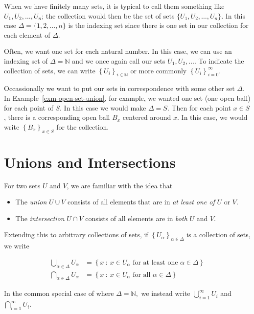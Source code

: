 \documentclass[
  letterpaper,
  DIV=11,
  numbers=noendperiod]{scrreprt}
\providecommand{\tightlist}{%
  \setlength{\itemsep}{0pt}\setlength{\parskip}{0pt}}
\def\N{\mathbb N}
\newcommand{\st}{~:~}
\theoremstyle{plain}
\theoremstyle{definition}
\theoremstyle{plain}
\theoremstyle{plain}
\theoremstyle{definition}
\theoremstyle{definition}
\theoremstyle{remark}
\begin{document}
When we have finitely many sets, it is typical to call them something
like \(U_1,U_2,\ldots,U_n\); the collection would then be the set of
sets \(\{U_1,U_2,\ldots,U_n\}\). In this case
\(\Delta=\{1,2,\ldots,n\}\) is the indexing set since there is one set
in our collection for each element of \(\Delta\).

Often, we want one set for each natural number. In this case, we can use
an indexing set of \(\Delta=\N\) and we once again call our sets
\(U_1,U_2,\ldots\). To indicate the collection of sets, we can write
\(\left\{U_i\right\}_{i\in\N}\) or more commonly
\(\left\{U_i\right\}_{i=0}^\infty\).

Occassionally we want to put our sets in correspondence with some other
set \(\Delta\). In Example~\ref{exm-open-set-union}, for example, we
wanted one set (one open ball) for each point of \(S\). In this case we
would make \(\Delta=S\). Then for each point \(x\in S\), there is a
corresponding open ball \(B_x\) centered around \(x\). In this case, we
would write \(\left\{B_x\right\}_{x\in S}\) for the collection.

\section{Unions and Intersections}\label{sec-union-intersection}

For two sets \(U\) and \(V\), we are familiar with the idea that

\begin{itemize}
\tightlist
\item
  The \emph{union} \(U\cup V\) consists of all elements that are in
  \emph{at least one of} \(U\) or \(V\).
\item
  The \emph{intersection} \(U\cap V\) consists of all elements are in
  \emph{both} \(U\) and \(V\).
\end{itemize}

Extending this to arbitrary collections of sets, if
\(\left\{U_\alpha\right\}_{\alpha\in\Delta}\) is a collection of sets,
we write

\[\begin{aligned}
  \bigcup_{\alpha\in\Delta} U_\alpha &= \left\{x\st \text{$x\in U_\alpha$ for at least one $\alpha\in\Delta$}\right\}\\
  \bigcap_{\alpha\in\Delta} U_\alpha &= \left\{x\st \text{$x\in U_\alpha$ for all $\alpha\in\Delta$}\right\}
\end{aligned}\]

In the common special case of where \(\Delta=\N,\) we instead write
\(\displaystyle \bigcup_{i=1}^\infty U_i\) and
\(\displaystyle \bigcap_{i=1}^\infty U_i.\)
\end{document}
